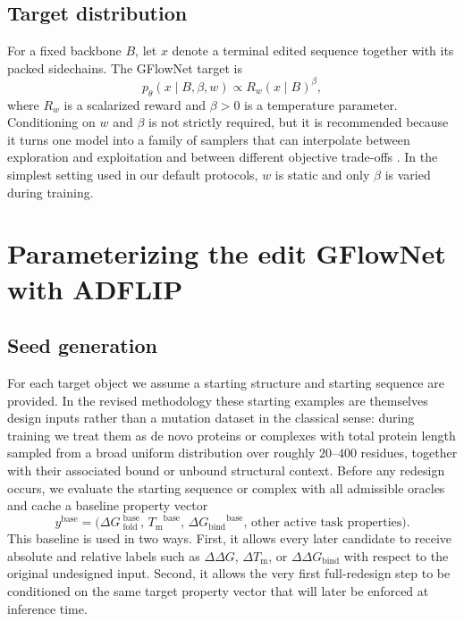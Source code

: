 \documentclass[11pt]{article}
\newcommand{\dG}{\ensuremath{\Delta G \ }}
\newcommand{\Tm}{\ensuremath{T_{\mathrm m}}}
\newcommand{\DGbind}{\ensuremath{\Delta G_{\mathrm{bind}}}}
\begin{document}
	\subsection{Target distribution}
	
	For a fixed backbone $B$, let $x$ denote a terminal edited sequence together with its packed sidechains. The GFlowNet target is
	\begin{equation}
		\label{eq:targetdist}
		p_\theta(x\mid B,\beta,w) \propto R_w(x\mid B)^\beta,
	\end{equation}
	where $R_w$ is a scalarized reward and $\beta>0$ is a temperature parameter. Conditioning on $w$ and $\beta$ is not strictly required, but it is recommended because it turns one model into a family of samplers that can interpolate between exploration and exploitation and between different objective trade-offs \citep{kim2023lsl-gfn,jain2023mogfn}. In the simplest setting used in our default protocols, $w$ is static and only $\beta$ is varied during training.
	
	\section{Parameterizing the edit GFlowNet with ADFLIP}
	\label{sec:param}
	
	
	\subsection{Seed generation}
	
	For each target object we assume a starting structure and starting sequence are provided. In the revised methodology these starting examples are themselves design inputs rather than a mutation dataset in the classical sense: during training we treat them as de novo proteins or complexes with total protein length sampled from a broad uniform distribution over roughly $20$--$400$ residues, together with their associated bound or unbound structural context. Before any redesign occurs, we evaluate the starting sequence or complex with all admissible oracles and cache a baseline property vector
	\begin{equation}
		y^{\mathrm{base}} = \big(\dG_{\mathrm{fold}}^{\mathrm{base}},\,\Tm^{\mathrm{base}},\,\DGbind^{\mathrm{base}},\,\text{other active task properties}\big).
	\end{equation}
	This baseline is used in two ways. First, it allows every later candidate to receive absolute and relative labels such as $\Delta\Delta G$, $\Delta \Tm$, or $\Delta\Delta G_{\mathrm{bind}}$ with respect to the original undesigned input. Second, it allows the very first full-redesign step to be conditioned on the same target property vector that will later be enforced at inference time.
	
\end{document}
